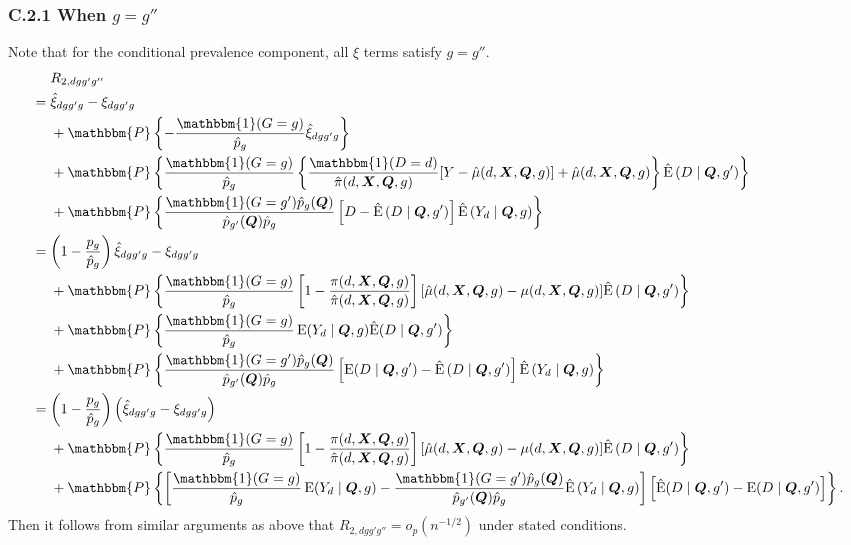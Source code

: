 \documentclass[12pt,a4paper]{article}
\newcommand{\E}{\operatorname{E}}
\def\X{{\boldsymbol X}}
\def\Q{{\boldsymbol Q}}
\def\one{\mathbbm{1}}
\def\P{\mathbbm{P}}
\begin{document}
\subsubsection*{C.2.1 When $g=g''$}
Note that for the conditional prevalence component, all $\xi$ terms satisfy $g=g''$.
\begin{align*}
&\phantom{{}={}} R_{2,dgg'g''} \\
&= \hat{\xi}_{dgg'g} - \xi_{dgg'g} \\
    &\phantom{{}={}} + \P \left\{- \frac{\one(G=g)}{\hat{p}_{g}}  \hat{\xi}_{dgg'g} \right\} \\
    &\phantom{{}={}} + \P \left\{ \frac{\one(G=g) }{\hat{p}_{g}} \left\{ \frac{\one(D=d)}{\hat{\pi}(d,\X,\Q,g)} [Y-\hat{\mu}(d,\X,\Q,g)]+\hat{\mu}(d,\X,\Q,g) \right\} \hat{\E} \left(D \mid \Q,g' \right) \right\} \\
    &\phantom{{}={}} + \P \left\{ \frac{\one(G=g')\hat{p}_{g}(\Q)}{\hat{p}_{g'}(\Q)\hat{p}_{g}} \left[ D-\hat{\E} \left(D \mid \Q, g' \right) \right] \hat{\E}\left( Y_d \mid \Q, g \right) \right\} \\
    &=  \left(1-\frac{p_g}{\hat{p}_g}\right)\hat{\xi}_{dgg'g} - \xi_{dgg'g} \\
    &\phantom{{}={}} + \P \left\{ \frac{\one(G=g) }{\hat{p}_{g}}  \left[ 1-\frac{\pi(d,\X,\Q,g)}{\hat{\pi}(d,\X,\Q,g)} \right]  [\hat{\mu}(d,\X,\Q,g)-\mu(d,\X,\Q,g)]  \hat{\E} \left(D \mid \Q,g' \right) \right\} \\
    &\phantom{{}={}}  + \P \left\{ \frac{\one(G=g) }{\hat{p}_{g}} \E(Y_d \mid \Q,g) \hat{\E}(D \mid \Q, g') \right\}\\
    &\phantom{{}={}} + \P \left\{ \frac{\one(G=g')\hat{p}_{g}(\Q)}{\hat{p}_{g'}(\Q)\hat{p}_{g}} \left[ \E(D \mid \Q, g')-\hat{\E} \left(D \mid \Q, g' \right) \right] \hat{\E}\left( Y_d \mid \Q, g \right) \right\} \\
    &= \left(1-\frac{p_g}{\hat{p}_g}\right)\left(\hat{\xi}_{dgg'g} - \xi_{dgg'g} \right) \\
    &\phantom{{}={}} + \P \left\{ \frac{\one(G=g) }{\hat{p}_{g}} \left[ 1-\frac{\pi(d,\X,\Q,g)}{\hat{\pi}(d,\X,\Q,g)} \right]  [\hat{\mu}(d,\X,\Q,g)-\mu(d,\X,\Q,g)]  \hat{\E} \left(D \mid \Q,g' \right) \right\} \\
    &\phantom{{}={}} + \P \left\{ \left[ \frac{\one(G=g) }{\hat{p}_{g}} \E(Y_d \mid \Q,g) - \frac{\one(G=g')\hat{p}_{g}(\Q)}{\hat{p}_{g'}(\Q)\hat{p}_{g}} \hat{\E}\left( Y_d \mid \Q, g \right) \right] \left[ \hat{\E}(D \mid \Q, g') - \E(D \mid \Q, g') \right] \right\}.
\end{align*}
Then it follows from similar arguments as above that $R_{2,dgg'g''}=o_p(n^{-1/2})$ under stated conditions.
\end{document}
